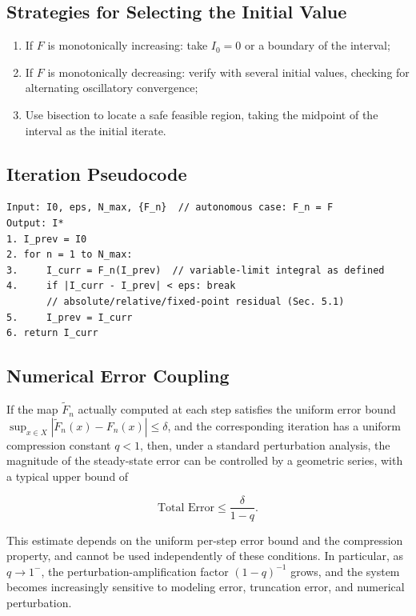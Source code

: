 \documentclass[11pt,a4paper]{amsart}
\begin{document}
\subsection{Strategies for Selecting the Initial Value}

\begin{enumerate}
\item If $F$ is monotonically increasing: take $I_0 = 0$ or a boundary of the interval;
\item If $F$ is monotonically decreasing: verify with several initial values, checking for alternating oscillatory convergence;
\item Use bisection to locate a safe feasible region, taking the midpoint of the interval as the initial iterate.
\end{enumerate}

\subsection{Iteration Pseudocode}

\begin{verbatim}
Input: I0, eps, N_max, {F_n}  // autonomous case: F_n = F
Output: I*
1. I_prev = I0
2. for n = 1 to N_max:
3.     I_curr = F_n(I_prev)  // variable-limit integral as defined
4.     if |I_curr - I_prev| < eps: break
       // absolute/relative/fixed-point residual (Sec. 5.1)
5.     I_prev = I_curr
6. return I_curr
\end{verbatim}

\subsection{Numerical Error Coupling}

If the map $\widetilde{F}_n$ actually computed at each step satisfies the uniform error bound $\sup_{x\in X}|\widetilde{F}_n(x) - F_n(x)| \le \delta$, and the corresponding iteration has a uniform compression constant $q < 1$, then, under a standard perturbation analysis, the magnitude of the steady-state error can be controlled by a geometric series, with a typical upper bound of

\begin{equation}
\label{eq:total-error}
\text{Total Error} \le \frac{\delta}{1-q}.
\end{equation}

This estimate depends on the uniform per-step error bound and the compression property, and cannot be used independently of these conditions. In particular, as $q \to 1^{-}$, the perturbation-amplification factor $(1-q)^{-1}$ grows, and the system becomes increasingly sensitive to modeling error, truncation error, and numerical perturbation.
\end{document}
